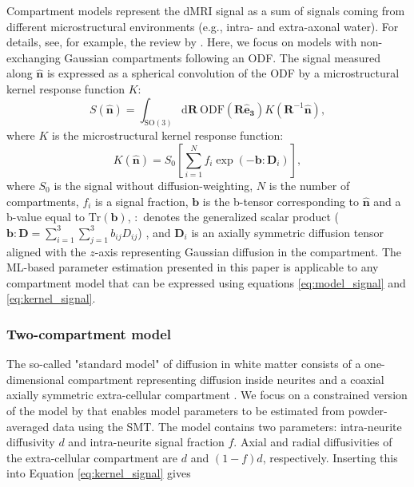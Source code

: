\documentclass[10pt, letterpaper, oneside]{article}
\begin{document}
Compartment models represent the dMRI signal as a sum of signals coming from different microstructural environments (e.g., intra- and extra-axonal water). For details, see, for example, the review by \cite{jelescu2017design}. Here, we focus on models with non-exchanging Gaussian compartments following an ODF. The signal measured along $\mathbf{\hat{n}}$ is expressed as a spherical convolution of the ODF by a microstructural kernel response function $K$: 
\begin{equation}\label{eq:model_signal}
S(\mathbf{\hat{n}}) = \int_{\text{SO}(3)} \text{d}\mathbf{R} \ \text{ODF}(\mathbf{R} \mathbf{\hat{e}_3}) K(\mathbf{R}^{-1} \mathbf{\hat{n}}) ,
\end{equation}
where $K$ is the microstructural kernel response function:
\begin{equation}\label{eq:kernel_signal}
K(\mathbf{\hat{n}}) = S_0 \left[ \sum_{i=1}^N f_i \exp(- \mathbf{b}:\mathbf{D}_i) \right] ,
\end{equation}
where $S_0$ is the signal without diffusion-weighting, $N$ is the number of compartments, $f_i$ is a signal fraction, $\mathbf{b}$ is the b-tensor corresponding to $\mathbf{\hat{n}}$ and a b-value equal to $\text{Tr}(\mathbf{b})$, $:$ denotes the generalized scalar product ($\mathbf{b}:\mathbf{D} = \sum_{i=1}^3 \sum_{j=1}^3 b_{ij} D_{ij}$) \citep{westin2016q}, and $\mathbf{D}_i$ is an axially symmetric diffusion tensor aligned with the $z$-axis representing Gaussian diffusion in the compartment. The ML-based parameter estimation presented in this paper is applicable to any compartment model that can be expressed using equations \ref{eq:model_signal} and \ref{eq:kernel_signal}. 

\subsubsection{Two-compartment model}

The so-called "standard model" of diffusion in white matter consists of a one-dimensional compartment representing diffusion inside neurites and a coaxial axially symmetric extra-cellular compartment \citep{novikov2019quantifying}. We focus on a constrained version of the model by \cite{kaden2016multi} that enables model parameters to be estimated from powder-averaged data using the SMT. The model contains two parameters: intra-neurite diffusivity $d$ and intra-neurite signal fraction $f$. Axial and radial diffusivities of the extra-cellular compartment are $d$ and $(1 - f)d$, respectively. Inserting this into Equation \ref{eq:kernel_signal} gives
\end{document}
